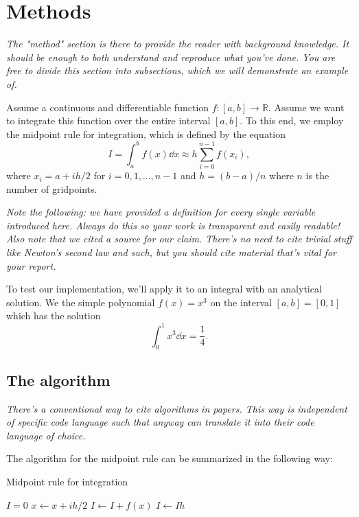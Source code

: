 \documentclass[english,notitlepage, reprint]{revtex4-1}  %
\begin{document}
	\section{Methods}
	\textit{The "method" section is there to provide the reader with background knowledge. It should be enough to both understand and reproduce what you've done. You are free to divide this section into subsections, which we will demonstrate an example of.}
	
	Assume a continuous and differentiable function $f : [a,b] \to \mathbb{R}$. Assume we want to integrate this function over the entire interval $[a,b]$. To this end, we employ the midpoint rule for integration, which is defined by the equation \cite{midpoint_rule}
	\begin{equation}
		I = \int_a^b f(x)\dd x \approx h\sum_{i=0}^{n-1} f(x_i), 
	\end{equation}
	where $x_i = a + ih/2$ for $i = 0, 1, ..., n-1$ and $h = (b-a)/n$ where $n$ is the number of gridpoints.
	
	\textit{Note the following: we have provided a definition for every single variable introduced here. Always do this so your work is transparent and easily readable! Also note that we cited a source for our claim. There's no need to cite trivial stuff like Newton's second law and such, but you should cite material that's vital for your report.}
	
	To test our implementation, we'll apply it to an integral with an analytical solution. We the simple polynomial $f(x) = x^3$ on the interval $[a,b] = [0,1]$ which has the solution 
	\begin{equation}
		\int_0^1 x^3 \dd x = \frac{1}{4}.
	\end{equation}
	
	\subsection*{The algorithm}
	\textit{There's a conventional way to cite algorithms in papers. This way is independent of specific code language such that anyway can translate it into their code language of choice.}
	
	The algorithm for the midpoint rule can be summarized in the following way:
	
	\begin{algorithm}[H]
		\caption{Midpoint rule for integration}\label{algo:midpoint_rule}
		\begin{algorithmic}
			\State $I = 0$ 
			\State $x \leftarrow x + ih/2$   %
			\State $I \leftarrow I + f(x)$  %
			\EndFor
			\State $I \leftarrow Ih$ 
		\end{algorithmic}
	\end{algorithm}
	
\end{document}
